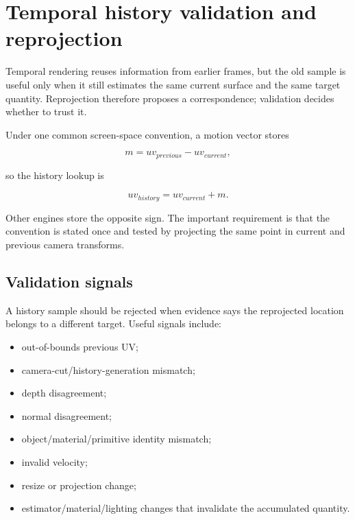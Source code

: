\hypertarget{appendix-e8c352e39466}{}\label{referencestart:appendix-e8c352e39466}
\section{Temporal history validation and reprojection}\label{appendix-e8c352e39466-temporal-history-validation-and-reprojection}

\hypertarget{appendix-e8c352e39466-temporal-history-validation-and-reprojection}{}

Temporal rendering reuses information from earlier frames, but the old sample is useful only when it still estimates the same current surface and the same target quantity. Reprojection therefore proposes a correspondence; validation decides whether to trust it.

Under one common screen-space convention, a motion vector stores

\[
m = uv_{previous}-uv_{current},
\]

so the history lookup is

\[
uv_{history}=uv_{current}+m.
\]

Other engines store the opposite sign. The important requirement is that the convention is stated once and tested by projecting the same point in current and previous camera transforms.

\subsection{Validation signals}\label{appendix-e8c352e39466-validation-signals}

\hypertarget{appendix-e8c352e39466-validation-signals}{}

A history sample should be rejected when evidence says the reprojected location belongs to a different target. Useful signals include:

\begin{itemize}
\tightlist
\item
  out-of-bounds previous UV;
\item
  camera-cut/history-generation mismatch;
\item
  depth disagreement;
\item
  normal disagreement;
\item
  object/material/primitive identity mismatch;
\item
  invalid velocity;
\item
  resize or projection change;
\item
  estimator/material/lighting changes that invalidate the accumulated quantity.
\end{itemize}

